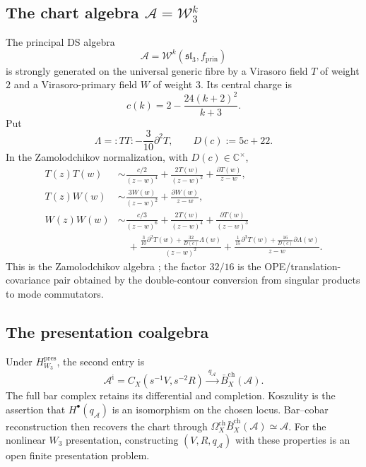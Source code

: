 \subsection{The chart algebra \texorpdfstring{$\mathcal A=\mathcal W_3^k$}{A=W3}}
\label{subsec:w3hol-A}

The principal DS algebra
\[
\mathcal A=\mathcal W^k(\mathfrak{sl}_3,f_{\mathrm{prin}})
\]
is strongly generated on the universal generic fibre by a Virasoro
field \(T\) of weight \(2\) and a Virasoro-primary field \(W\) of
weight \(3\).  Its central charge is
\begin{equation}
\label{eq:w3hol-central-charge}
c(k)=2-\frac{24(k+2)^2}{k+3}.
\end{equation}
Put
\[
\Lambda={:}TT{:}-\frac{3}{10}\partial^2T,
\qquad D(c):=5c+22.
\]
In the Zamolodchikov normalization, with \(D(c)\in\mathbb C^\times\),
\begin{align*}
T(z)T(w)&\sim
\frac{c/2}{(z-w)^4}
+\frac{2T(w)}{(z-w)^2}
+\frac{\partial T(w)}{z-w},\\
T(z)W(w)&\sim
\frac{3W(w)}{(z-w)^2}
+\frac{\partial W(w)}{z-w},\\
W(z)W(w)&\sim
\frac{c/3}{(z-w)^6}
+\frac{2T(w)}{(z-w)^4}
+\frac{\partial T(w)}{(z-w)^3}\\
&\quad+
\frac{\frac{3}{10}\partial^2T(w)
+\frac{32}{D(c)}\Lambda(w)}{(z-w)^2}
+\frac{\frac{1}{15}\partial^3T(w)
+\frac{16}{D(c)}\partial\Lambda(w)}{z-w}.
\end{align*}
This is the Zamolodchikov algebra
\cite{Zamolodchikov,Bouwknegt-Schoutens}; the factor \(32/16\)
is the OPE/translation-covariance pair obtained by the double-contour
conversion from singular products to mode commutators.

\subsection{The presentation coalgebra}
\label{subsec:w3hol-A-i}

Under \(H_{W_3}^{\mathrm{pres}}\), the second entry is
\begin{equation}\label{eq:w3hol-ai}
\mathcal A^{\mathrm i}
=C_X(s^{-1}V,s^{-2}R)
\xrightarrow{\ q_{\mathcal A}\ }
\bar B_X^{\mathrm{ch}}(\mathcal A).
\end{equation}
The full bar complex retains its differential and completion.
Koszulity is the assertion that \(H^\bullet(q_{\mathcal A})\) is an
isomorphism on the chosen locus.  Bar--cobar reconstruction then
recovers the chart through
\(\Omega_X^{\mathrm{ch}}\bar B_X^{\mathrm{ch}}(\mathcal A)
\simeq\mathcal A\).
For the nonlinear \(W_3\) presentation, constructing
\((V,R,q_{\mathcal A})\) with these properties is an open finite
presentation problem.

